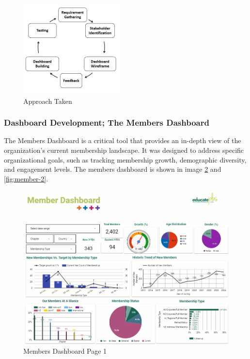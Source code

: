 \documentclass[11pt,a4paper,]{article}
\begin{document}
\begin{figure}[H]

{\centering \includegraphics[width=200px]{Images/Approach_taken} 

}

\caption{Approach Taken}\label{fig:approach}
\end{figure}

\subsubsection{Dashboard Development; The Members Dashboard}\label{dashboard-development-the-members-dashboard}

The Members Dashboard is a critical tool that provides an in-depth view of the organization's current membership landscape. It was designed to address specific organizational goals, such as tracking membership growth, demographic diversity, and engagement levels. The members dashboard is shown in image \ref{fig:member-1} and \ref{fig:member-2}.

\begin{figure}[H]

{\centering \includegraphics[width=0.9\linewidth]{Images/members_dashboard_page_1} 

}

\caption{Members Dashboard Page 1}\label{fig:member-1}
\end{figure}
\end{document}
